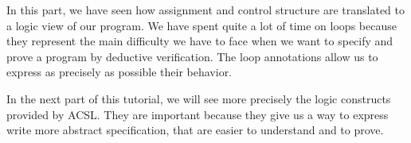 














\horizontalLine



In this part, we have seen how assignment and control structure are translated
to a logic view of our program. We have spent quite a lot of time on loops
because they represent the main difficulty we have to face when we want to
specify and prove a program by deductive verification. The loop annotations
allow us to express as precisely as possible their behavior.



In the next part of this tutorial, we will see more precisely the logic
constructs provided by ACSL. They are important because they give us a way to
express write more abstract specification, that are easier to understand and
to prove.
